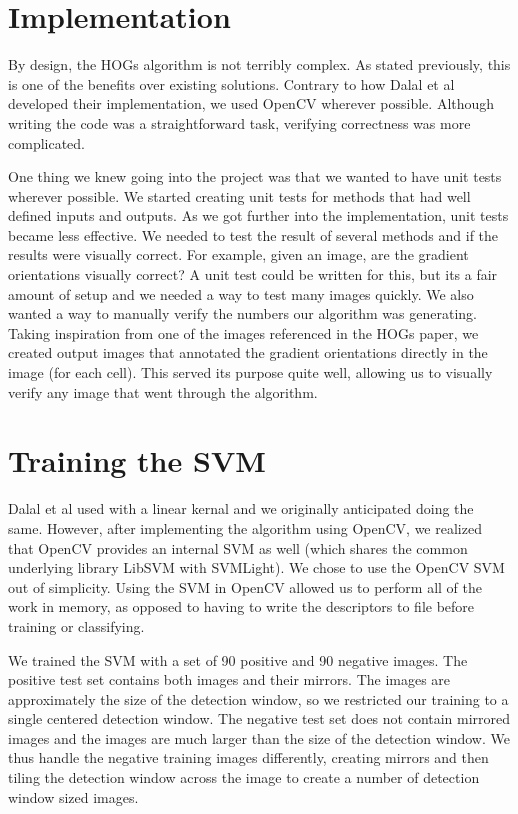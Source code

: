\documentclass[a4paper,11pt]{article}
\begin{document}
\begin{multicols}{2}

\section{Implementation}
By design, the HOGs algorithm is not terribly complex. As stated previously, this is one of the benefits 
over existing solutions. Contrary to how Dalal et al developed their implementation, we used 
OpenCV wherever possible. Although writing the code was a straightforward task, verifying correctness 
was more complicated.

One thing we knew going into the project was that we wanted to have unit tests wherever possible. We started 
creating unit tests for methods that had well defined inputs and outputs. As we got further into the 
implementation, unit tests became less effective. We needed to test the result of several methods and 
if the results were visually correct. For example, given an image, are the gradient orientations visually 
correct? A unit test could be written for this, but its a fair amount of setup and we needed a way to test 
many images quickly. We also wanted a way to manually verify the numbers our algorithm was generating. Taking 
inspiration from one of the images referenced in the HOGs paper, we created output images that annotated the 
gradient orientations directly in the image (for each cell). This served its purpose quite well, allowing 
us to visually verify any image that went through the algorithm.

\section{Training the SVM}
Dalal et al used with a linear kernal and we originally anticipated doing the same.
However, after implementing the algorithm using OpenCV, we realized that OpenCV provides an internal 
SVM as well (which shares the common underlying library LibSVM with SVMLight). We chose 
to use the OpenCV SVM out of simplicity.  Using the SVM in OpenCV allowed us to perform all of the 
work in memory, as opposed to having to write the descriptors to file before training or classifying.

We trained the SVM with a set of 90 positive and 90 negative images.  The positive test set contains 
both images and their mirrors. The images are approximately the size of the detection window, 
so we restricted our training to a single centered detection window. The negative test set does not 
contain mirrored images and the images are much larger than the size of the detection window.  
We thus handle the negative training images differently, creating mirrors and then tiling the 
detection window across the image to create a number of detection window sized images.


\end{multicols}
\end{document}
